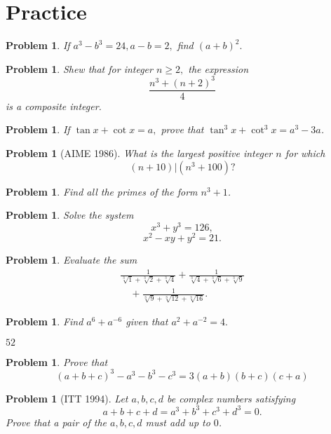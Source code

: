 \documentclass[11pt, openany]{book}
\theoremstyle{change} \theoremheaderfont{\blue\sffamily\bfseries}
\newtheorem{pro}[thm]{Problem}
\theoremstyle{nonumberplain} \theoremheaderfont{\sffamily\bfseries}
\newcommand{\í}{\'{\i}}
\begin{document}
\section*{Practice}\begin{multicols}{2}\columnseprule 1pt \columnsep 25pt

\begin{pro}
If $a^3 - b^3 = 24, a - b = 2,$  find $(a + b)^2.$
\end{pro}
\begin{pro}
Shew that for integer $n \geq 2,$ the expression
$$\frac{n^3 + (n + 2)^3}{4}$$is a composite integer.
\end{pro}
\begin{pro} If $\tan x + \cot x = a,$  prove that  $\tan ^3 x + \cot ^3 x = a^3 - 3a$. \end{pro}

\begin{pro}[AIME 1986] What is the largest positive integer $n$
for which $$ (n + 10)|(n^3 + 100)?$$ \end{pro}
\begin{pro}Find all the primes of the form $n^3 +
1$.\end{pro}
\begin{pro}
Solve the system
$$x^3 + y^3 = 126,$$$$x^2 - xy + y^2 = 21.$$
\end{pro}
\begin{pro}
Evaluate the sum
$$\begin{array}{l}\frac{1}{\sqrt[3]{1} + \sqrt[3]{2} + \sqrt[3]{4} } + \frac{1}{\sqrt[3]{4} + \sqrt[3]{6} +
\sqrt[3]{9}} \\ \quad + \frac{1}{\sqrt[3]{9} + \sqrt[3]{12} +
\sqrt[3]{16}}.\end{array}$$
\end{pro}
\begin{pro} Find $a^6 + a^{-6}$ given that $a^2 + a^{-2} = 4. $

\begin{answer}
$52$
\end{answer}

 \end{pro}
\begin{pro}
Prove  that
\begin{equation}
(a + b + c)^3 - a^3 - b^3 - c^3 = 3(a + b)(b + c)(c + a)
\end{equation}
\end{pro}
\begin{pro}[ITT 1994] Let $a, b, c, d$ be complex numbers satisfying
 $$ a + b + c + d = a^3 + b^3 + c^3 +
d^3 = 0.$$Prove that a pair of the $a, b, c, d$ must add up to
$0$. \end{pro}
\end{multicols}
\end{document}
